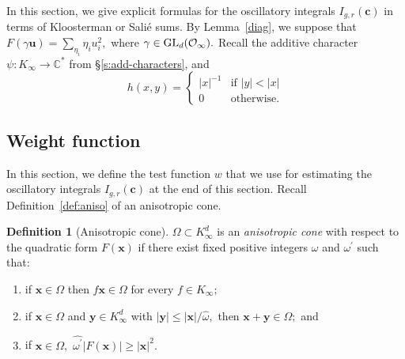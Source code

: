 \documentclass[10pt]{amsart}
\theoremstyle{plain}
\theoremstyle{plain}
\renewcommand{\vec}[1]{\mathbf{#1}}
\theoremstyle{remark}
\theoremstyle{definition}
\newtheorem{definition}[theorem]{Definition}
\renewcommand{\hat}{\widehat}
\newcommand{\GL}{\textup{GL}}
\newcommand{\CC}{\mathbb{C}}
\newcommand{\cO}{\mathcal{O}}
\begin{document}
In this section, we give explicit formulas for the oscillatory integrals $I_{g,r}(\vec{c})$ in terms of Kloosterman or Sali\'e sums. By Lemma~\ref{diag}, we suppose  that $F(\gamma\vec{u})=\sum_{\eta_i} \eta_iu_i^2,$ where $\gamma\in \GL_d(\cO_{\infty}).$
 Recall the additive character $\psi:K_\infty\to \CC^*$ from 
\S \ref{s:add-characters}, and 
\[h(x,y)=\begin{cases}|x|^{-1} & \mbox{if $|y|<|x|$}\\ 0 & \mbox{otherwise.}\end{cases}\]
\subsection{Weight function}
In this section, we define the test function $w$ that we use for estimating the oscillatory integrals $I_{g,r}(\vec{c})$ at the end of this section. Recall Definition~\ref{def:aniso} of an anisotropic cone.
\begin{definition}[Anisotropic cone]
$\Omega\subset K_{\infty}^d$ is an \textit{anisotropic cone} with respect to the quadratic form $F(\vec{x})$ if there exist fixed positive integers $\omega$  and  $\omega^{\prime}$ such that: 
\begin{enumerate}
\item \label{prop1} if $\vec{x}\in \Omega$ then $f\vec{x}\in \Omega$ for every $f\in K_\infty;$
\item \label{prop2} if $\vec{x}\in\Omega$ and $\vec{y} \in  K_\infty^d $ with $|\vec{y}|\leq |\vec{x}|/ \hat{\omega},$ then $\vec{x}+\vec{y} \in \Omega;$ and 
\item \label{prop3}  if $\vec{x}\in\Omega,$  $ \hat{\omega^{\prime}} |F(\vec{x})| \geq |\vec{x}|^2.$
\end{enumerate}
\end{definition}
\end{document}
